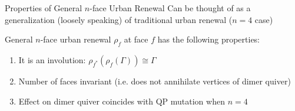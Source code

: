 \begin{frame}{Properties of General $n$-face Urban Renewal}
    Can be thought of as a generalization (loosely speaking) of traditional urban renewal ($n = 4$ case) \cite[Section~2.5]{fominIntroductionClusterAlgebras2021a}

    \begin{theorem}
        \justifying
        General $n$-face urban renewal $\rho_f$ at face $f$ has the following properties:
        \begin{enumerate}
            \justifying
            \item It is an involution: $\rho_{f^*}(\rho_f(\Gamma)) \cong \Gamma$
            
            \vspace{0.5cm}
    
            \item Number of faces invariant (i.e. does not annihilate vertices of dimer quiver)
            
            \vspace{0.5cm}
    
            \item Effect on dimer quiver coincides with QP mutation when $n = 4$
        \end{enumerate}
    \end{theorem}
\end{frame}
